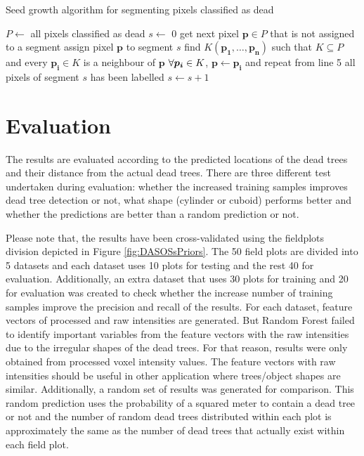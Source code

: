 \documentclass{subfiles}
\begin{document}
 \begin{algorithm}
 	\caption{Seed growth algorithm for segmenting pixels classified as dead}
 	\label{alg:seedGrownth}
 	\centering
 	\begin{algorithmic}[1]
 		\State $P \gets $ all pixels classified as dead  %
 		\State $s \gets $ 0 
        \State get next pixel $\boldsymbol{p} \in P$ that is not assigned to a segment
 		\State  assign pixel $\boldsymbol{p} $ to segment $s$
 		\State  find $K(\boldsymbol{p_1},\dots, \boldsymbol{p_n})$ such that $K \subseteq P$ and every $\boldsymbol{p_i} \in K$ is a neighbour of $\boldsymbol{p}$
 		\State $ \forall \space \boldsymbol{p_i} \in K $, $\boldsymbol{p} \gets \boldsymbol{p_i}$ and repeat from line 5
 		\State all pixels of segment $s$ has been labelled
 		\State $s \gets s + 1 $
 		\EndWhile
 	\end{algorithmic}
 \end{algorithm}



\section{Evaluation} 


    
\par The results are evaluated according to the predicted locations of the dead trees and their distance from the actual dead trees. There are three different test undertaken during evaluation: whether the increased training samples improves dead tree detection or not, what shape (cylinder or cuboid) performs better and whether the predictions are better than a random prediction or not. 
   
   \par Please note that, the results have been cross-validated using the fieldplots division depicted in Figure \ref{fig:DASOSsPriors}. The 50 field plots are divided into 5 datasets and each dataset uses 10 plots for testing and the rest 40 for evaluation. Additionally, an extra dataset that uses 30 plots for training and 20 for evaluation was created to check whether the increase number of training samples improve the precision and recall of the results. For each dataset, feature vectors of processed and raw intensities are generated. But Random Forest failed to identify important variables from the feature vectors with the raw intensities due to the irregular shapes of the dead trees. For that reason, results were only obtained from processed voxel intensity values. The feature vectors with raw intensities should be useful in other application where trees/object shapes are similar. Additionally, a random set of results was generated for comparison. This random prediction uses the probability of a squared meter to contain a dead tree or not and the number of random dead trees distributed within each plot is approximately the same as the number of dead trees that actually exist within each field plot.
   
\end{document}
